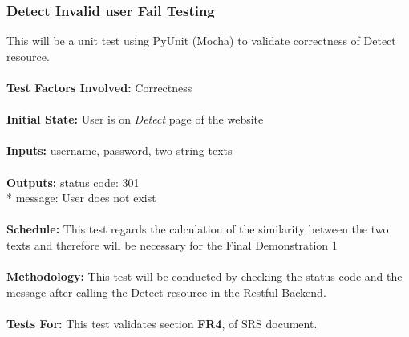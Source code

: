 \documentclass[12pt, titlepage]{article}
\begin{document}
\subsubsection{{Detect Invalid user Fail Testing}}
This will be a unit test using PyUnit (Mocha) to validate correctness of Detect resource. \\
\\
\textbf{Test Factors Involved:} Correctness \\
\\
\textbf{Initial State: } User is on \textit{Detect} page of the website \\
\\
\textbf{Inputs: } username, password, two string texts \\
\\
\textbf{Outputs:} status code: 301 \\*
                  message: User does not exist \\
\\
\textbf{Schedule:} This test regards the calculation of the similarity between the two texts and therefore will be necessary for the Final Demonstration 1 \\
\\
\textbf{Methodology: } This test will be conducted by checking the status code and the message after calling the Detect resource in the Restful Backend. \\
\\
\textbf{Tests For:} This test validates section \textbf{FR4}, of SRS document.

\end{document}
